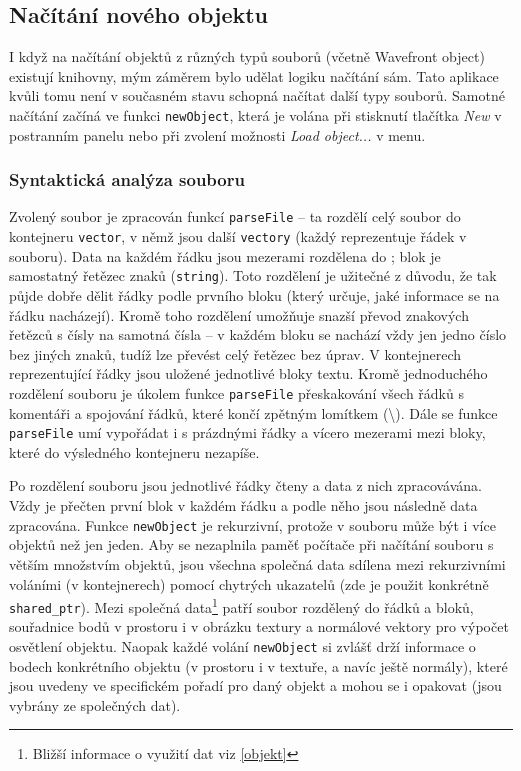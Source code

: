 \documentclass[a4paper, 11pt]{report}
\begin{document}
\subsection{Načítání nového objektu}
I když na načítání objektů z různých typů souborů (včetně Wavefront object) existují knihovny, mým záměrem bylo udělat logiku načítání sám. Tato aplikace kvůli tomu není v současném stavu schopná načítat další typy souborů. Samotné načítání začíná ve funkci \texttt{newObject}, která je volána při stisknutí tlačítka \emph{New} v postranním panelu nebo při zvolení možnosti \emph{Load object...} v menu.

\subsubsection{Syntaktická analýza souboru}
Zvolený soubor je zpracován funkcí \texttt{parseFile} -- ta rozdělí celý soubor do kontejneru \texttt{vector}, v němž jsou další \texttt{vectory} (každý reprezentuje řádek v souboru). Data na každém řádku jsou mezerami rozdělena do ; blok je samostatný řetězec znaků (\texttt{string}). Toto rozdělení je užitečné z důvodu, že tak půjde dobře dělit řádky podle prvního bloku (který určuje, jaké informace se na řádku nacházejí). Kromě toho rozdělení umožňuje snazší převod znakových řetězců s čísly na samotná čísla -- v každém bloku se nachází vždy jen jedno číslo bez jiných znaků, tudíž lze převést celý řetězec bez úprav. V kontejnerech reprezentující řádky jsou uložené jednotlivé bloky textu. Kromě jednoduchého rozdělení souboru je úkolem funkce \texttt{parseFile} přeskakování všech řádků s komentáři a spojování řádků, které končí zpětným lomítkem (\textbackslash). Dále se funkce \texttt{parseFile} umí vypořádat i s prázdnými řádky a vícero mezerami mezi bloky, které do výsledného kontejneru nezapíše.

Po rozdělení souboru jsou jednotlivé řádky čteny a data z nich zpracovávána. Vždy je přečten první blok v každém řádku a podle něho jsou následně data zpracována. Funkce \texttt{newObject} je rekurzivní, protože v souboru může být i více objektů než jen jeden. Aby se nezaplnila paměť počítače při načítání souboru s větším množstvím objektů, jsou všechna společná data sdílena mezi rekurzivními voláními (v kontejnerech) pomocí chytrých ukazatelů (zde je použit konkrétně \texttt{shared\_ptr}). Mezi společná data\footnote{Bližší informace o využití dat viz \ref{objekt}} patří soubor rozdělený do řádků a bloků, souřadnice bodů v prostoru i v obrázku textury a normálové vektory pro výpočet osvětlení objektu. Naopak každé volání \texttt{newObject} si zvlášť drží informace o bodech konkrétního objektu (v prostoru i v textuře, a navíc ještě normály), které jsou uvedeny ve specifickém pořadí pro daný objekt a mohou se i opakovat (jsou vybrány ze společných dat).
\end{document}
